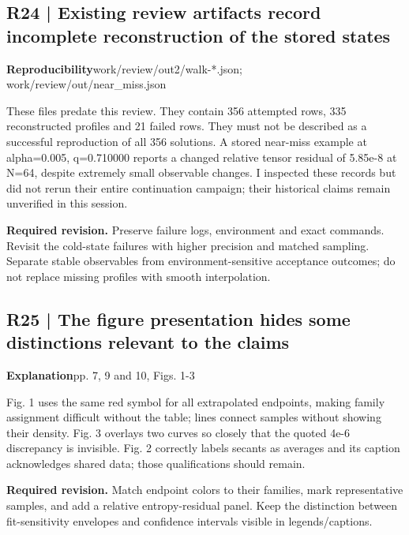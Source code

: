\documentclass[10pt,a4paper]{article}
\begin{document}
\subsection*{R24 | Existing review artifacts record incomplete reconstruction of the stored states}
\textbf{Reproducibility}\quad work/review/out2/walk-*.json; work/review/out/near\_miss.json

These files predate this review. They contain 356 attempted rows, 335 reconstructed profiles and 21 failed rows. They must not be described as a successful reproduction of all 356 solutions. A stored near-miss example at alpha=0.005, q=0.710000 reports a changed relative tensor residual of 5.85e-8 at N=64, despite extremely small observable changes. I inspected these records but did not rerun their entire continuation campaign; their historical claims remain unverified in this session.

\textbf{Required revision.} Preserve failure logs, environment and exact commands. Revisit the cold-state failures with higher precision and matched sampling. Separate stable observables from environment-sensitive acceptance outcomes; do not replace missing profiles with smooth interpolation.

\subsection*{R25 | The figure presentation hides some distinctions relevant to the claims}
\textbf{Explanation}\quad pp. 7, 9 and 10, Figs. 1-3

Fig. 1 uses the same red symbol for all extrapolated endpoints, making family assignment difficult without the table; lines connect samples without showing their density. Fig. 3 overlays two curves so closely that the quoted 4e-6 discrepancy is invisible. Fig. 2 correctly labels secants as averages and its caption acknowledges shared data; those qualifications should remain.

\textbf{Required revision.} Match endpoint colors to their families, mark representative samples, and add a relative entropy-residual panel. Keep the distinction between fit-sensitivity envelopes and confidence intervals visible in legends/captions.
\end{document}
